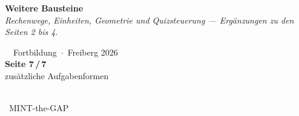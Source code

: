 \documentclass[a4paper,landscape,9pt]{extarticle}
\begin{document}
\noindent\begin{tcolorbox}[
  enhanced, frame hidden, sharp corners,
  colback=extraorange, coltext=white,
  left=12pt, right=8pt, top=4pt, bottom=4pt,
  before skip=0pt, after skip=4pt,
  width=\linewidth, borderline west={4pt}{-4pt}{extraorange!55}
]
\begin{minipage}[c]{0.66\linewidth}
  {\sffamily\fontsize{26}{28}\selectfont\bfseries Weitere Bausteine}\\[2pt]
  {\sffamily\footnotesize\itshape\color{white!90} Rechenwege, Einheiten, Geometrie und Quizsteuerung — Ergänzungen zu den Seiten 2 bis 4.}
\end{minipage}\hfill
\begin{minipage}[c]{0.20\linewidth}\raggedright
  {\sffamily\scriptsize\color{white!85}\faGraduationCap~~Fortbildung~$\cdot$~Freiberg 2026}\\[2pt]
  {\sffamily\bfseries\normalsize Seite 7\,/\,7}\\[1pt]
  {\sffamily\scriptsize\color{white!75} zusätzliche Aufgabenformen}
\end{minipage}\hfill
\begin{minipage}[c]{0.10\linewidth}\centering
  {\color{black}\colorbox{white}{\hspace{1pt}\hspace{1pt}}}\\[1pt]
  {\sffamily\scriptsize\color{white!90}\faGithub~MINT-the-GAP}
\end{minipage}
\end{tcolorbox}
\end{document}
